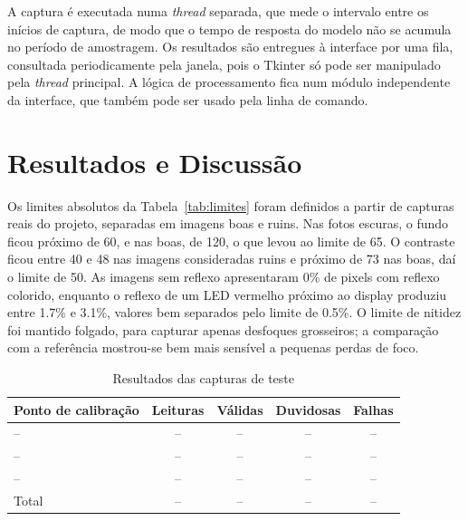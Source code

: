 \documentclass[10pt,twocolumn,letterpaper]{article}
\begin{document}
A captura é executada numa \textit{thread} separada, que mede o intervalo entre
os inícios de captura, de modo que o tempo de resposta do modelo não se acumula
no período de amostragem. Os resultados são entregues à interface por uma fila,
consultada periodicamente pela janela, pois o Tkinter só pode ser manipulado
pela \textit{thread} principal. A lógica de processamento fica num módulo
independente da interface, que também pode ser usado pela linha de comando.

\section{Resultados e Discussão}

Os limites absolutos da Tabela~\ref{tab:limites} foram definidos a partir de
capturas reais do projeto, separadas em imagens boas e ruins. Nas fotos
escuras, o fundo ficou próximo de 60, e nas boas, de 120, o que levou ao limite
de 65. O contraste ficou entre 40 e 48 nas imagens consideradas ruins e próximo
de 73 nas boas, daí o limite de 50. As imagens sem reflexo apresentaram 0\% de
pixels com reflexo colorido, enquanto o reflexo de um LED vermelho próximo ao
display produziu entre 1.7\% e 3.1\%, valores bem separados pelo limite de
0.5\%. O limite de nitidez foi mantido folgado, para capturar apenas desfoques
grosseiros; a comparação com a referência mostrou-se bem mais sensível a
pequenas perdas de foco.

\begin{table}[!t]
\centering
\caption{Resultados das capturas de teste}
\label{tab:resultados}
\footnotesize
\begin{tabular}{@{}l c c c c@{}}
\toprule
Ponto de calibração & Leituras & Válidas & Duvidosas & Falhas \\
\midrule
--  & -- & -- & -- & -- \\
--  & -- & -- & -- & -- \\
--  & -- & -- & -- & -- \\
\midrule
Total & -- & -- & -- & -- \\
\bottomrule
\end{tabular}
\end{table}
\end{document}
